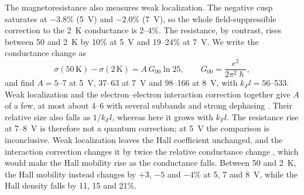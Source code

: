 \documentclass[11pt]{article}
\begin{document}
The magnetoresistance also measures weak localization. The negative cusp saturates at $-3.8$\% (5~V) and $-2.0$\% (7~V), so the whole field-suppressible correction to the 2~K conductance is 2--4\%. The resistance, by contrast, rises between 50 and 2~K by 10\% at 5~V and 19--24\% at 7~V. We write the conductance change as
\begin{equation}
\sigma(50\,\mathrm{K})-\sigma(2\,\mathrm{K})=A\,G_{00}\ln 25,\qquad G_{00}=\frac{e^2}{2\pi^2\hslash},
\end{equation}
and find $A=5$--7 at 5~V, 37--63 at 7~V and 98--166 at 8~V, with $k_Fl=56$--533. Weak localization and the electron--electron interaction correction together give $A$ of a few, at most about 4--6 with several subbands and strong dephasing \cite{AltshulerAronov1980,LeeRamakrishnan1985}. Their relative size also falls as $1/k_Fl$, whereas here it grows with $k_Fl$. The resistance rise at 7--8~V is therefore not a quantum correction; at 5~V the comparison is inconclusive. Weak localization leaves the Hall coefficient unchanged, and the interaction correction changes it by twice the relative conductance change \cite{AltshulerAronov1980,LeeRamakrishnan1985}, which would make the Hall mobility rise as the conductance falls. Between 50 and 2~K, the Hall mobility instead changes by $+3$, $-5$ and $-4$\% at 5, 7 and 8~V, while the Hall density falls by 11, 15 and 21\%.
\end{document}
